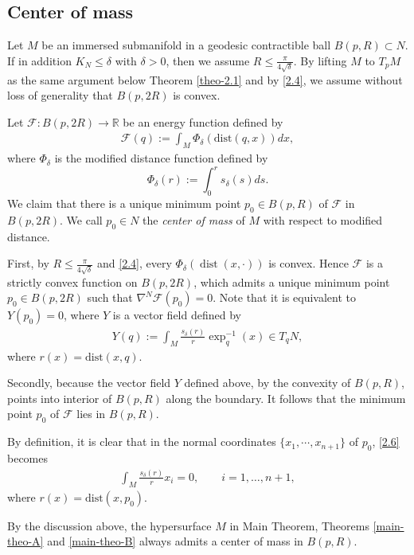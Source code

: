 \documentclass{amsart}
\numberwithin{equation}{section}
\theoremstyle{remark}
\renewcommand{\(}{\left(}
\renewcommand{\)}{\right)}
\renewcommand{\~}{\tilde}
\renewcommand{\-}{\overline}
\newcommand{\R}{\mathbb{R}}
\renewcommand{\d}{\delta}
\newcommand{\ra}{\rightarrow}
\newcommand{\mrm}{\mathrm}
\begin{document}
\subsection{Center of mass}\label{sec:2.4}
Let $M$ be an immersed submanifold in a geodesic contractible ball $B(p,R)\subset N$. If in addition $K_N\le \d$ with $\d>0$, then we assume $R\le \frac{\pi}{4\sqrt{\d}}$. By lifting $M$ to $T_pM$ as the same argument below Theorem \ref{theo-2.1} and by \eqref{2.4}, we assume without loss of generality that $B(p,2R)$ is convex.

Let $\mathcal{F}: B(p,2R)\ra \R$ be an energy function defined by
\begin{align*}
\mathcal{F}(q):=\int_{M} \Phi_\d(\mrm{dist}(q,x)) dx,
\end{align*}
where $\Phi_\d$ is the modified distance function  defined by
\begin{equation}\label{2.2}
\Phi_\d(r):=\int_0^rs_\d(s)ds.
\end{equation}
We claim that there is a unique minimum point $p_0\in B(p,R)$ of $\mathcal{F}$ in $B(p,2R)$. We call $p_0\in N$ the {\em center of mass} of $M$ with respect to modified distance.

First, by $R\le \frac{\pi}{4\sqrt{\d}}$ and \eqref{2.4}, every $\Phi_\d(\operatorname{dist}(x,\cdot))$ is convex. Hence $\mathcal{F}$ is a strictly convex function on $B(p,2R)$, which admits a unique minimum point $p_0\in B(p,2R)$ such that $\nabla^N \mathcal F(p_0)=0$. Note that it is equivalent to $Y(p_0)=0$, where $Y$ is a vector field defined by
\begin{align}\label{2.6}
Y(q):=\int_M \frac{s_\d(r)}{r}\exp_q^{-1}(x)\in T_qN,
\end{align}
where $r(x)=\mrm{dist}(x,q)$.

Secondly, because the vector field $Y$ defined above, by the convexity of $B(p,R)$, points into interior of $B(p,R)$ along the boundary. It follows that the minimum point $p_0$ of $\mathcal{F}$ lies in $B(p,R)$.

By definition, it is clear that in the normal coordinates $\{x_1,\cdots,x_{n+1}\}$ of $p_0$, \eqref{2.6} becomes
\begin{align}\label{center-mass-test-func}
\int_M \frac{s_\d(r)}{r}x_i=0, \qquad i=1,\dots,n+1,
\end{align}
where $r(x)=\mrm{dist}(x,p_0)$.

By the discussion above, the hypersurface $M$ in Main Theorem, Theorems \ref{main-theo-A} and \ref{main-theo-B} always admits a center of mass in $B(p,R)$.
\end{document}
